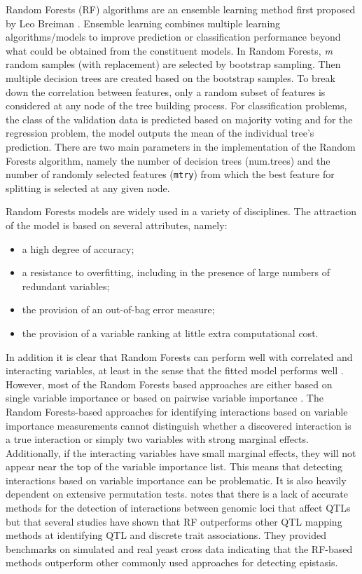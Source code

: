 \documentclass[preprint,12pt,3p]{elsarticle}
\begin{document}
Random Forests (RF) algorithms are an ensemble learning method first proposed by Leo Breiman \cite[]{Breiman2001}. Ensemble
learning combines multiple learning algorithms/models to improve prediction or classification performance beyond what
could be obtained from the constituent models. In Random Forests, \textit{m} random samples (with replacement) are
selected by bootstrap sampling. Then multiple decision trees are created based on the bootstrap samples. To break down
the correlation between features, only a random subset of features is considered at any node of the tree building
process. For classification problems, the class of the validation data is predicted based on majority voting and for the
regression problem, the model outputs the mean of the individual tree's prediction. There are two main parameters in the
implementation of the Random Forests algorithm, namely the number of decision trees (num.trees) and the number of
randomly selected features (\texttt{mtry}) from which the best feature for splitting is selected at any given node.

Random Forests models are widely used \cite[]{lundbergConsistentIndividualizedFeature2019} in a variety of
disciplines. The attraction of the model is based on several attributes, namely:
\begin{itemize} 
\item a high degree of accuracy;
\item a resistance to overfitting, including in the presence of large numbers of redundant variables; 
\item the provision of an out-of-bag error measure; 
\item the provision of a variable ranking at little extra computational cost.
\end{itemize}
 
In addition it is clear that Random Forests can perform well with correlated and interacting variables, at least in the
sense that the fitted model performs well \cite[]{Ziegler.et.al.2007}. However, most of the Random Forests based
approaches are either based on single variable importance \cite[]{Jiang.et.al.2009, yoshidaSNPInterForestNewMethod2011}
or based on pairwise variable importance \cite[]{Ziegler.et.al.2007}. The Random Forests-based approaches for identifying
interactions based on variable importance measurements cannot distinguish whether a discovered interaction is a true
interaction or simply two variables with strong marginal effects. Additionally, if the interacting variables have small
marginal effects, they will not appear near the top of the variable importance list. This means that detecting
interactions based on variable importance can be problematic. It is also heavily dependent on extensive permutation
tests.  \cite{schmalohrDetectionEpistaticInteractions2018} notes that there is a lack of accurate methods for the
detection of interactions between genomic loci that affect QTLs but that several studies have shown that RF outperforms
other QTL mapping methods at identifying QTL and discrete trait associations. They provided benchmarks on simulated and
real yeast cross data indicating that the RF-based methods outperform other commonly used approaches for detecting
epistasis.
\end{document}
